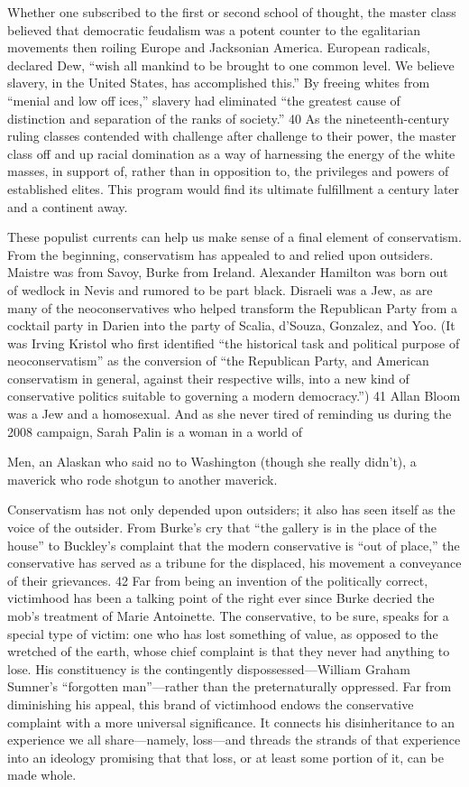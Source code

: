  \par 
Whether one subscribed to the first or second school of thought, the master class believed that democratic feudalism was a potent counter to the egalitarian movements then roiling Europe and Jacksonian America. European radicals, declared Dew, “wish all mankind to be brought to one common level. We believe slavery, in the United States, has accomplished this.” By freeing whites from “menial and low off ices,” slavery had eliminated “the greatest cause of distinction and separation of the ranks of society.” 40 As the nineteenth-century ruling classes contended with challenge after challenge to their power, the master class off and up racial domination as a way of harnessing the energy of the white masses, in support of, rather than in opposition to, the privileges and powers of established elites. This program would find its ultimate fulfillment a century later and a continent away.
 \par 
These populist currents can help us make sense of a final element of conservatism. From the beginning, conservatism has appealed to and relied upon outsiders. Maistre was from Savoy, Burke from Ireland. Alexander Hamilton was born out of wedlock in Nevis and rumored to be part black. Disraeli was a Jew, as are many of the neoconservatives who helped transform the Republican Party from a cocktail party in Darien into the party of Scalia, d’Souza, Gonzalez, and Yoo. (It was Irving Kristol who first identified “the historical task and political purpose of neoconservatism” as the conversion of “the Republican Party, and American conservatism in general, against their respective wills, into a new kind of conservative politics suitable to governing a modern democracy.”) 41 Allan Bloom was a Jew and a homosexual. And as she never tired of reminding us during the 2008 campaign, Sarah Palin is a woman in a world of
 \par 
Men, an Alaskan who said no to Washington (though she really didn’t), a maverick who rode shotgun to another maverick.
 \par 
Conservatism has not only depended upon outsiders; it also has seen itself as the voice of the outsider. From Burke’s cry that “the gallery is in the place of the house” to Buckley’s complaint that the modern conservative is “out of place,” the conservative has served as a tribune for the displaced, his movement a conveyance of their grievances. 42 Far from being an invention of the politically correct, victimhood has been a talking point of the right ever since Burke decried the mob’s treatment of Marie Antoinette. The conservative, to be sure, speaks for a special type of victim: one who has lost something of value, as opposed to the wretched of the earth, whose chief complaint is that they never had anything to lose. His constituency is the contingently dispossessed—William Graham Sumner’s “forgotten man”—rather than the preternaturally oppressed. Far from diminishing his appeal, this brand of victimhood endows the conservative complaint with a more universal significance. It connects his disinheritance to an experience we all share—namely, loss—and threads the strands of that experience into an ideology promising that that loss, or at least some portion of it, can be made whole.
